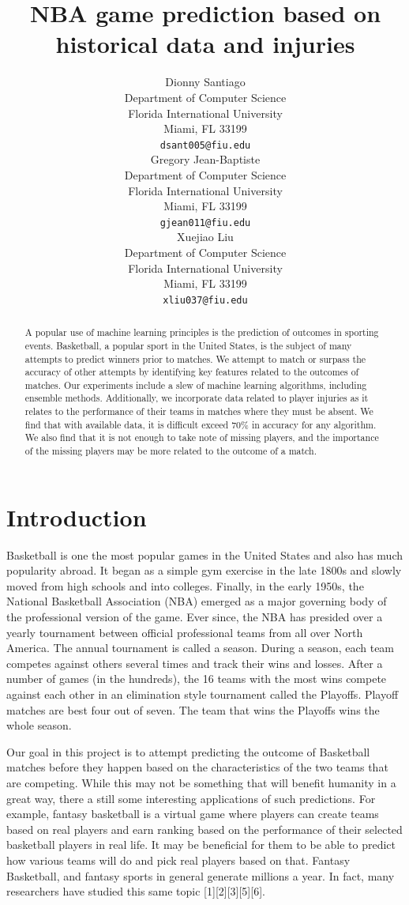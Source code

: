 \documentclass{article}
\title{NBA game prediction based on historical data and injuries}
\author{
  Dionny Santiago\\
  Department of Computer Science\\
  Florida International University\\
  Miami, FL 33199 \\
  \texttt{dsant005@fiu.edu} \\
  \And
  Gregory Jean-Baptiste\\
  Department of Computer Science\\
  Florida International University\\
  Miami, FL 33199 \\
  \texttt{gjean011@fiu.edu} \\
  \And
  Xuejiao Liu\\
  Department of Computer Science\\
  Florida International University\\
  Miami, FL 33199 \\
  \texttt{xliu037@fiu.edu} \\
}
\begin{document}

\maketitle

\begin{abstract}
  A popular use of machine learning principles is the prediction of outcomes in sporting events. Basketball, a popular sport in the United States, is the subject of many attempts to predict winners prior to matches. We attempt to match or surpass the accuracy of other attempts by identifying key features related to the outcomes of matches. Our experiments include a slew of machine learning algorithms, including ensemble methods. Additionally, we incorporate data related to player injuries as it relates to the performance of their teams in matches where they must be absent. We find that with available data, it is difficult exceed 70\% in accuracy for any algorithm. We also find that it is not enough to take note of missing players, and the importance of the missing players may be more related to the outcome of a match.
\end{abstract}

\section{Introduction}

Basketball is one the most popular games in the United States and also has much popularity abroad. It began as a simple gym exercise in the late 1800\textquotesingle s and slowly moved from high schools and into colleges. Finally, in the early 1950\textquotesingle s, the National Basketball Association (NBA) emerged as a major governing body of the professional version of the game. Ever since, the NBA has presided over a yearly tournament between official professional teams from all over North America. The annual tournament is called a season. During a season, each team competes against others several times and track their wins and losses. After a number of games (in the hundreds), the 16 teams with the most wins compete against each other in an elimination style tournament called the Playoffs. Playoff matches are best four out of seven. The team that wins the Playoffs wins the whole season. 

Our goal in this project is to attempt predicting the outcome of Basketball matches before they happen based on the characteristics of the two teams that are competing. While this may not be something that will benefit humanity in a great way, there a still some interesting applications of such predictions. For example, fantasy basketball is a virtual game where players can create teams based on real players and earn ranking based on the performance of their selected basketball players in real life. It may be beneficial for them to be able to predict how various teams will do and pick real players based on that. Fantasy Basketball, and fantasy sports in general generate millions a year. In fact, many researchers have studied this same topic [1][2][3][5][6].
\end{document}
